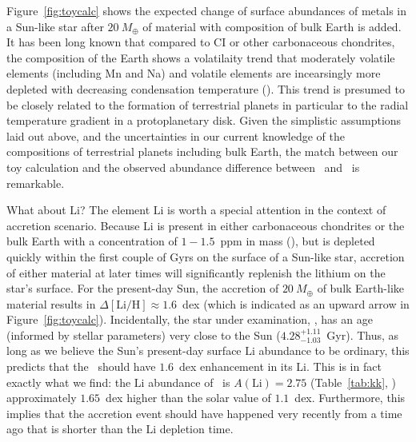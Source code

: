 \documentclass[manuscript]{aastex6}
\newcommand{\figname}{Figure}
\newcommand*\elem[1]{\ensuremath{\mathrm{#1}}}
\newcommand*\elemH[1]{\ensuremath{[\mathrm{#1}/\elem{H}]}}
\newcommand{\sunanalog}{\text{Krios}}
\newcommand{\bizarreone}{\text{Kronos}}
\newcommand{\mearth}{\ensuremath{M_\oplus}}
\begin{document}
Figure~\ref{fig:toycalc} shows the expected change of surface abundances of
metals in a Sun-like star after $20~\mearth$ of material with composition of
bulk Earth is added.
It has been long known that compared to CI or other carbonaceous chondrites,
the composition of the Earth shows a volatilaity trend that moderately volatile
elements (including Mn and Na) and volatile elements are incearsingly more
depleted with decreasing condensation temperature
(\citealt{mcdonough2001composition}).
This trend is presumed to be closely related to the formation of terrestrial
planets in particular to the radial temperature gradient in a protoplanetary
disk.
Given the simplistic assumptions laid out above, and the uncertainties in our
current knowledge of the compositions of terrestrial planets including bulk
Earth, the match between our toy calculation and the observed abundance
difference between \bizarreone\ and \sunanalog\ is remarkable.


What about \elem{Li}?
The element \elem{Li} is worth a special attention in the context of accretion scenario.
Because Li is present in either carbonaceous chondrites or the bulk Earth with
a concentration of $1-1.5$~ppm in mass (\citealt{mcdonough2001composition}),
but is depleted quickly within the first couple of Gyrs on the surface of a
Sun-like star, accretion of either material at later times will significantly
replenish the lithium on the star's surface.
For the present-day Sun, the accretion of $20~\mearth$ of bulk Earth-like
material results in $\Delta\elemH{Li} \approx 1.6$~dex (which
is indicated as an upward arrow in \figname~\ref{fig:toycalc}).
Incidentally, the star under examination, \bizarreone, has an age (informed by
stellar parameters) very close to the Sun ($4.28_{-1.03}^{+1.11}$~Gyr).
Thus, as long as we believe the Sun's present-day surface \elem{Li} abundance
to be ordinary, this predicts that the \bizarreone\ should have $1.6$~dex enhancement
in its \elem{Li}.
This is in fact exactly what we find: the \elem{Li} abundance of \bizarreone\ is
$A(\elem{Li}) = 2.75$ (Table~\ref{tab:kk}, \citealt{jmlithium})
approximately $1.65$~dex higher than the solar value of $1.1$~dex.
Furthermore, this implies that the accretion event should have happened very
recently from a time ago that is shorter than the \elem{Li} depletion time.

\end{document}
